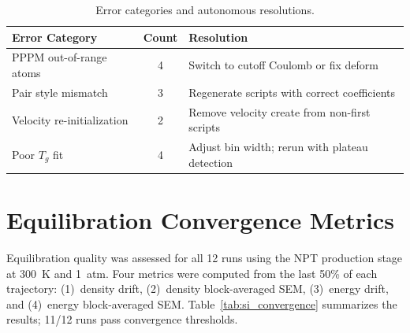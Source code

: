 \documentclass[journal=acsami,manuscript=suppinfo]{achemso}
\begin{document}
\begin{table}[H]
\centering
\caption{Error categories and autonomous resolutions.}
\label{tab:si_errors}
\small
\begin{tabular}{lcl}
\toprule
\textbf{Error Category} & \textbf{Count} & \textbf{Resolution} \\
\midrule
PPPM out-of-range atoms & 4 & Switch to cutoff Coulomb or fix deform \\
Pair style mismatch & 3 & Regenerate scripts with correct coefficients \\
Velocity re-initialization & 2 & Remove velocity create from non-first scripts \\
Poor $T_g$ fit & 4 & Adjust bin width; rerun with plateau detection \\
\bottomrule
\end{tabular}
\end{table}


\section{Equilibration Convergence Metrics}
\label{sec:si_convergence}

Equilibration quality was assessed for all 12 runs using the NPT production stage at 300~K and 1~atm.
Four metrics were computed from the last 50\% of each trajectory: (1)~density drift, (2)~density block-averaged SEM, (3)~energy drift, and (4)~energy block-averaged SEM.
Table~\ref{tab:si_convergence} summarizes the results; 11/12 runs pass convergence thresholds.
\end{document}

